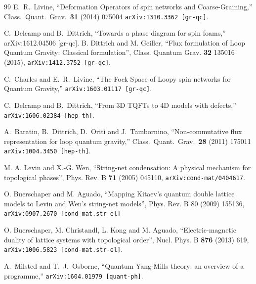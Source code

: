 \documentclass[nofootinbib,superscriptaddress,eqsecnum,tightenlines,11pt]{revtex4-1}
\begin{document}
\begin{thebibliography}{99}
 E.~R.~Livine,
  ``Deformation Operators of spin networks and Coarse-Graining,''
  Class.\ Quant.\ Grav.\  {\bf 31} (2014) 075004
  \texttt{arXiv:1310.3362 [gr-qc]}.

C.~Delcamp and B.~Dittrich,
``Towards a phase diagram for spin foams,''
arXiv:1612.04506 [gr-qc].
 B. Dittrich and M. Geiller,
``Flux formulation of Loop Quantum Gravity: Classical formulation'',
Class. Quantum Grav. \textbf{32} 135016 (2015), \texttt{arXiv:1412.3752 [gr-qc]}.


C.~Charles and E.~R.~Livine,
  ``The Fock Space of Loopy spin networks for Quantum Gravity,''
  \texttt{arXiv:1603.01117 [gr-qc]}.
  
   C.~Delcamp and B.~Dittrich,
  ``From 3D TQFTs to 4D models with defects,''
  \texttt{arXiv:1606.02384 [hep-th]}.
  
  
  A.~Baratin, B.~Dittrich, D.~Oriti and J.~Tambornino,
  ``Non-commutative flux representation for loop quantum gravity,''
  Class.\ Quant.\ Grav.\  {\bf 28} (2011) 175011
  \texttt{arXiv:1004.3450 [hep-th]}.

   M. A. Levin and X.-G. Wen,
``String-net condensation: A physical mechanism for topological phases'',
Phys. Rev. B \textbf{71} (2005) 045110, \texttt{arXiv:cond-mat/0404617}.

 O. Buerschaper and M. Aguado, 
``Mapping Kitaev's quantum double lattice models to Levin and Wen's string-net models'',
Phys. Rev. B 80 (2009) 155136, \texttt{arXiv:0907.2670 [cond-mat.str-el]}

O. Buerschaper, M. Christandl, L. Kong and M. Aguado,
``Electric-magnetic duality of lattice systems with topological order'',
Nucl. Phys. B \textbf{876} (2013) 619, \texttt{arXiv:1006.5823 [cond-mat.str-el]}.


 A.~Milsted and T.~J.~Osborne,
  ``Quantum Yang-Mills theory: an overview of a programme,''
  \texttt{arXiv:1604.01979 [quant-ph]}.


\end{thebibliography}
\end{document}

